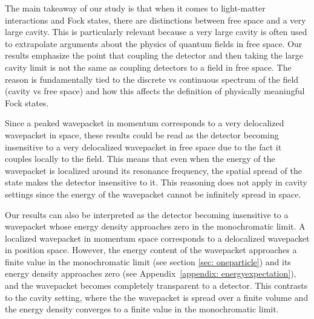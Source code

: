 \documentclass[11pt,prd,onecolumn,superscriptaddress,nofootinbib,floatfix,amsmath,amssymb]{revtex4-2}
\begin{document}
    
    
    
    
    The main takeaway of our study is that when it comes to light-matter interactions and Fock states, there are distinctions between  free space and a very large cavity. This is particularly relevant because a very large cavity is often used to extrapolate arguments about the physics of quantum fields in free space. Our results emphasize the point that coupling the detector and then taking the large cavity limit is not the same as coupling detectors to a field in free space. The reason is fundamentally tied to the discrete vs continuous spectrum of the field (cavity vs free space) and how this affects the definition of physically meaningful Fock states.
    
    {Since a peaked wavepacket in momentum corresponds to a very delocalized wavepacket in space, these results could be read as the detector becoming insensitive to a very delocalized wavepacket in free space due to the fact it couples locally to the field. This means that even when the energy of the wavepacket is localized around its resonance frequency, the spatial spread of the state makes the detector insensitive to it. This reasoning does not apply in cavity settings since the energy of the wavepacket cannot be infinitely spread in space.}
    
   {Our results can also be interpreted as the detector becoming insensitive to a wavepacket whose energy density approaches zero in the monochromatic limit. A localized wavepacket in momentum space corresponds to a delocalized wavepacket in position space. However, the energy content of the wavepacket approaches a finite value in the monochromatic limit (see section \ref{sec: oneparticle}) and its energy density approaches zero (see Appendix~\ref{appendix: energyexpectation}), and the wavepacket becomes completely transparent to a detector. This contrasts to the cavity setting, where the the wavepacket is spread over a finite volume and the energy density converges to a finite value in the monochromatic limit.}
    
\end{document}
